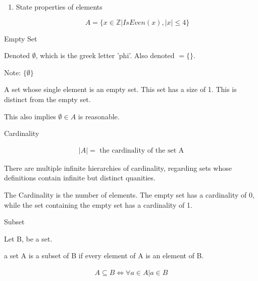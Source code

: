 \documentclass{report}
\begin{document}
\begin{description}
\begin{enumerate}
            \item State properties of elements

                \begin{displaymath}
                    A = \{ x \in \mathbb{Z} | IsEven(x), |x| \le 4 \}
                \end{displaymath}
            
        \end{enumerate}

        {\large Empty Set}

        Denoted $\emptyset$, which is the greek letter 'phi'.
        Also denoted $= \{ \}$.

        \begin{mdframed}
            Note: $\{ \emptyset \}$

            A set whose single element is an empty set.
            This set has a size of 1. This is distinct from
            the empty set.

            This also implies $ \emptyset \in A $ is reasonable.
        \end{mdframed}

    \item {\large Cardinality}

        \begin{gather}
            |A| = \text{ the cardinality of the set A} 
        \end{gather}

        \begin{mdframed}
            There are multiple infinite hierarchies of cardinality,
            regarding sets whose definitions contain infinite but distinct
            quanities.
        \end{mdframed}

        The Cardinality is the number of elements.
        The empty set has a cardinality of 0, while the
        set containing the empty set has a cardinality of 1.
        
    \pagebreak
    \item {\large Subset}

        Let B, be a set.

        a set A is a subset of B if every element
        of A is an element of B.

        \begin{gather}
            A \subseteq B \iff {\forall a \in A | a \in B} 
        \end{gather}


\end{description}
\end{document}

